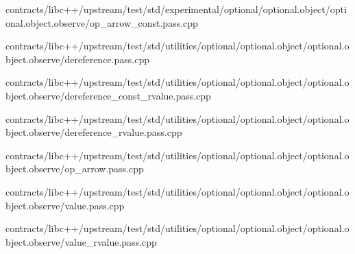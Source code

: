 \begin{DoxyCompactItemize}
contracts/libc++/upstream/test/std/experimental/optional/optional.\+object/optional.\+object.\+observe/op\+\_\+arrow\+\_\+const.\+pass.\+cpp\item 
contracts/libc++/upstream/test/std/utilities/optional/optional.\+object/optional.\+object.\+observe/dereference.\+pass.\+cpp\item 
contracts/libc++/upstream/test/std/utilities/optional/optional.\+object/optional.\+object.\+observe/dereference\+\_\+const\+\_\+rvalue.\+pass.\+cpp\item 
contracts/libc++/upstream/test/std/utilities/optional/optional.\+object/optional.\+object.\+observe/dereference\+\_\+rvalue.\+pass.\+cpp\item 
contracts/libc++/upstream/test/std/utilities/optional/optional.\+object/optional.\+object.\+observe/op\+\_\+arrow.\+pass.\+cpp\item 
contracts/libc++/upstream/test/std/utilities/optional/optional.\+object/optional.\+object.\+observe/value.\+pass.\+cpp\item 
contracts/libc++/upstream/test/std/utilities/optional/optional.\+object/optional.\+object.\+observe/value\+\_\+rvalue.\+pass.\+cpp\end{DoxyCompactItemize}

